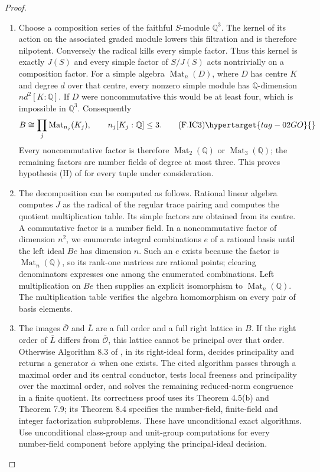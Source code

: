 \begin{proof}
\begin{enumerate}[label={$\langle1\rangle$\arabic*.}]
\item Choose a composition series of the faithful $S$-module $\mathbb Q^3$.
The kernel of its action on the associated graded module lowers this
filtration and is therefore nilpotent. Conversely the radical kills
every simple factor. Thus this kernel is exactly $J(S)$ and every
simple factor of $S/J(S)$ acts nontrivially on a composition factor.
For a simple algebra $\operatorname{Mat}_n(D)$, where $D$ has centre
$K$ and degree $d$ over that centre, every nonzero simple module has
$\mathbb Q$-dimension $n d^2[K:\mathbb Q]$. If $D$ were
noncommutative this would be at least four, which is impossible in
$\mathbb Q^3$. Consequently
\[
 B\cong\prod_j\operatorname{Mat}_{n_j}(K_j),\qquad
 n_j[K_j:\mathbb Q]\le3.                                    \tag{F.IC3}\hypertarget{tag-02GO}{}\label{maps:eq:F.IC3}
\]
Every noncommutative factor is therefore
$\operatorname{Mat}_2(\mathbb Q)$ or
$\operatorname{Mat}_3(\mathbb Q)$; the remaining factors are number
fields of degree at most three. This proves hypothesis (H) of
\cite[Algorithm 8.3, p.~21]{rootBHJ22} for every tuple under consideration.

\item The decomposition can be computed as follows. Rational linear algebra computes $J$ as the radical of the
regular trace pairing and computes the quotient multiplication table.
Its simple factors are obtained from its centre. A commutative factor
is a number field. In a noncommutative factor of dimension $n^2$, we
enumerate integral combinations $e$ of a rational basis until the
left ideal $Be$ has dimension $n$. Such an $e$ exists because the
factor is $\operatorname{Mat}_n(\mathbb Q)$, so its rank-one matrices
are rational points; clearing denominators expresses one among the
enumerated combinations. Left multiplication on $Be$ then supplies
an explicit isomorphism to $\operatorname{Mat}_n(\mathbb Q)$.
The multiplication table verifies the algebra homomorphism on every
pair of basis elements.

\item The images $\overline{\mathcal O}$ and $\overline L$ are a full order
and a full right lattice in $B$. If the right order of
$\overline L$ differs from $\overline{\mathcal O}$, this lattice
cannot be principal over that order. Otherwise Algorithm 8.3 of
\cite[Algorithm 8.3 and its correctness proof, p.~21]{rootBHJ22}, in its right-ideal form, decides principality and
returns a generator $\overline\alpha$ when one exists. The cited
algorithm passes through a maximal order and its central conductor,
tests local freeness and principality over the maximal order, and
solves the remaining reduced-norm congruence in a finite quotient.
Its correctness proof uses its Theorem 4.5(b) and Theorem 7.9; its
Theorem 8.4 specifies the number-field, finite-field and integer
factorization subproblems. These have unconditional exact algorithms.
Use unconditional class-group and unit-group computations for every
number-field component before applying the principal-ideal decision.


\end{enumerate}
\end{proof}
